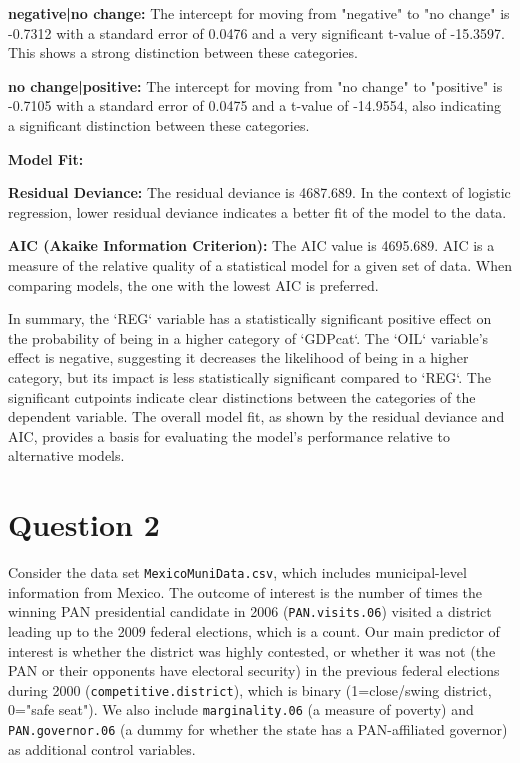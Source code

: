 \documentclass[12pt,letterpaper]{article}
\begin{document}
\begin{enumerate}
\textbf{negative|no change: }The intercept for moving from "negative" to "no change" is -0.7312 with a standard error of 0.0476 and a very significant t-value of -15.3597. This shows a strong distinction between these categories.

\textbf{no change|positive:} The intercept for moving from "no change" to "positive" is -0.7105 with a standard error of 0.0475 and a t-value of -14.9554, also indicating a significant distinction between these categories.

\textbf{Model Fit:}

\textbf{Residual Deviance: }The residual deviance is 4687.689. In the context of logistic regression, lower residual deviance indicates a better fit of the model to the data.

\textbf{AIC (Akaike Information Criterion):} The AIC value is 4695.689. AIC is a measure of the relative quality of a statistical model for a given set of data. When comparing models, the one with the lowest AIC is preferred.

In summary, the `REG` variable has a statistically significant positive effect on the probability of being in a higher category of `GDPcat`. The `OIL` variable's effect is negative, suggesting it decreases the likelihood of being in a higher category, but its impact is less statistically significant compared to `REG`. The significant cutpoints indicate clear distinctions between the categories of the dependent variable. The overall model fit, as shown by the residual deviance and AIC, provides a basis for evaluating the model’s performance relative to alternative models.
\end{enumerate}

\section*{Question 2} 
\vspace{.25cm}

\noindent Consider the data set \texttt{MexicoMuniData.csv}, which includes municipal-level information from Mexico. The outcome of interest is the number of times the winning PAN presidential candidate in 2006 (\texttt{PAN.visits.06}) visited a district leading up to the 2009 federal elections, which is a count. Our main predictor of interest is whether the district was highly contested, or whether it was not (the PAN or their opponents have electoral security) in the previous federal elections during 2000 (\texttt{competitive.district}), which is binary (1=close/swing district, 0="safe seat"). We also include \texttt{marginality.06} (a measure of poverty) and \texttt{PAN.governor.06} (a dummy for whether the state has a PAN-affiliated governor) as additional control variables. 
\end{document}

